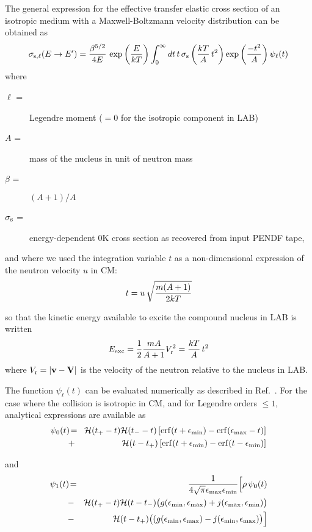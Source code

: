 The general expression for the effective transfer elastic cross section
of an isotropic medium with a Maxwell-Boltzmann velocity distribution can
be obtained as\cite{OUISLOUMEN}
\begin{equation}
\sigma_{{\rm s},\ell}(E\rightarrow E')={\beta^{5/2}\over 4E} \,
\exp\left({E\over kT}\right) \int_0^\infty dt \, t \, \sigma_{\rm s}
\left({kT\over A}\, t^2\right) \exp\left({-t^2\over A}\right) \psi_\ell(t)
\label{resk4}
\end{equation}
\noindent where
\begin{description}
\item [$\ell$ =] Legendre moment ($=0$ for the isotropic component in LAB)
\item [$A$ =] mass of the nucleus in unit of neutron mass
\item [$\beta$ =] $(A+1)/A$
\item [$\sigma_{\rm s}$ =] energy-dependent 0K cross section as recovered
from input PENDF tape,
\end{description}

\noindent and where we used the integration variable $t$ as a non-dimensional
expression of the neutron velocity $u$ in CM:
\begin{equation}
t=u\, \sqrt{m(A+1)\over 2kT}
\label{resk5}
\end{equation}

\noindent so that the kinetic energy available to excite the compound nucleus
in LAB is written
\begin{equation}
E_{\rm exc}={1\over 2} {mA\over A+1} V_{\rm r}^2={kT\over A}\, t^2
\label{resk6}
\end{equation}
\noindent where $V_{\rm r}=|{\bf v}-{\bf V}|$ is the velocity of the neutron
relative to the nucleus in LAB.

The function $\psi_\ell(t)$ can be evaluated numerically as described in
Ref.~\cite{RESK}. For the case where the collision is isotropic in CM,
and for Legendre orders $\le 1$, analytical expressions are available as
\begin{eqnarray}
\nonumber \psi_0(t) \negthinspace&=& \negthinspace{\cal H}(t_+ -t)
{\cal H}(t_- -t)\left[{\rm erf}(t+\epsilon_{\rm min})
-{\rm erf}(\epsilon_{\rm max} -t)\right] \\
&+& \negthinspace {\cal H} (t - t_+)\left[{\rm erf}
(t + \epsilon_{\rm min}) - {\rm erf}(t - \epsilon_{\rm min})\right]
\label{resk7}
\end{eqnarray}

\noindent and
\begin{eqnarray}
\nonumber \psi_1(t)\negthinspace&=& \negthinspace{1\over 4 \sqrt{\pi}
\epsilon_{\rm max} \epsilon_{\rm min}} \Big[\rho \, \psi_0(t) \\
\nonumber &-& \negthinspace {\cal H}(t_+ - t){\cal H}(t - t_-)
\big( g(\epsilon_{\rm min},\epsilon_{\rm max})+
j(\epsilon_{\rm max},\epsilon_{\rm min})\big) \\
&-& \negthinspace {\cal H}(t - t_+)
\big( (g(\epsilon_{\rm min}, \epsilon_{\rm max})-
j(\epsilon_{\rm min},\epsilon_{\rm max})\big)\Big]
\label{resk8}
\end{eqnarray}

